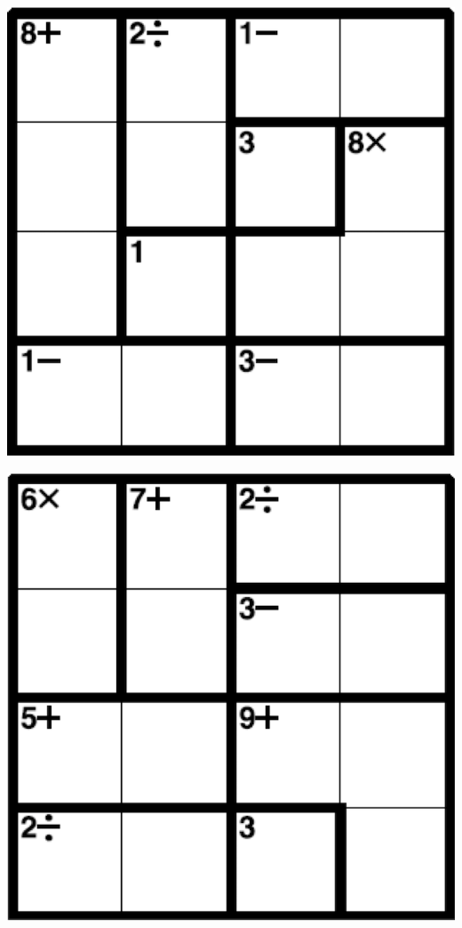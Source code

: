 
\includegraphics[scale=1]{Gambar/Lampiran/4x4_21.png}

\includegraphics[scale=1]{Gambar/Lampiran/4x4_22.png}
